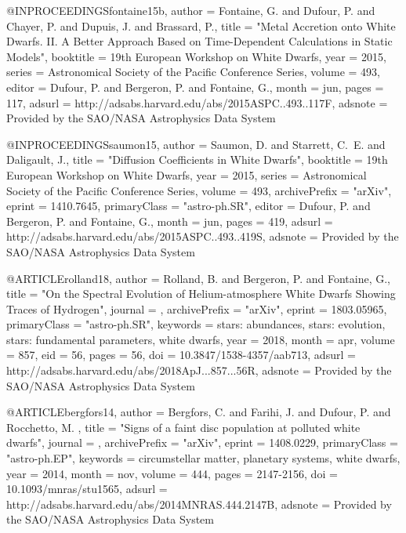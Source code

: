 \documentclass[a4paper,fleqn,usenatbib]{mnras}
\begin{document}
{{{@INPROCEEDINGS{fontaine15b,
   author = {{Fontaine}, G. and {Dufour}, P. and {Chayer}, P. and {Dupuis}, J. and 
	{Brassard}, P.},
    title = "{Metal Accretion onto White Dwarfs. II. A Better Approach Based on Time-Dependent Calculations in Static Models}",
booktitle = {19th European Workshop on White Dwarfs},
     year = 2015,
   series = {Astronomical Society of the Pacific Conference Series},
   volume = 493,
   editor = {{Dufour}, P. and {Bergeron}, P. and {Fontaine}, G.},
    month = jun,
    pages = {117},
   adsurl = {http://adsabs.harvard.edu/abs/2015ASPC..493..117F},
  adsnote = {Provided by the SAO/NASA Astrophysics Data System}
}

@INPROCEEDINGS{saumon15,
   author = {{Saumon}, D. and {Starrett}, C.~E. and {Daligault}, J.},
    title = "{Diffusion Coefficients in White Dwarfs}",
booktitle = {19th European Workshop on White Dwarfs},
     year = 2015,
   series = {Astronomical Society of the Pacific Conference Series},
   volume = 493,
archivePrefix = "arXiv",
   eprint = {1410.7645},
 primaryClass = "astro-ph.SR",
   editor = {{Dufour}, P. and {Bergeron}, P. and {Fontaine}, G.},
    month = jun,
    pages = {419},
   adsurl = {http://adsabs.harvard.edu/abs/2015ASPC..493..419S},
  adsnote = {Provided by the SAO/NASA Astrophysics Data System}
}





@ARTICLE{rolland18,
   author = {{Rolland}, B. and {Bergeron}, P. and {Fontaine}, G.},
    title = "{On the Spectral Evolution of Helium-atmosphere White Dwarfs Showing Traces of Hydrogen}",
  journal = {\apj},
archivePrefix = "arXiv",
   eprint = {1803.05965},
 primaryClass = "astro-ph.SR",
 keywords = {stars: abundances, stars: evolution, stars: fundamental parameters, white dwarfs},
     year = 2018,
    month = apr,
   volume = 857,
      eid = {56},
    pages = {56},
      doi = {10.3847/1538-4357/aab713},
   adsurl = {http://adsabs.harvard.edu/abs/2018ApJ...857...56R},
  adsnote = {Provided by the SAO/NASA Astrophysics Data System}
}

@ARTICLE{bergfors14,
   author = {{Bergfors}, C. and {Farihi}, J. and {Dufour}, P. and {Rocchetto}, M.
	},
    title = "{Signs of a faint disc population at polluted white dwarfs}",
  journal = {\mnras},
archivePrefix = "arXiv",
   eprint = {1408.0229},
 primaryClass = "astro-ph.EP",
 keywords = {circumstellar matter, planetary systems, white dwarfs},
     year = 2014,
    month = nov,
   volume = 444,
    pages = {2147-2156},
      doi = {10.1093/mnras/stu1565},
   adsurl = {http://adsabs.harvard.edu/abs/2014MNRAS.444.2147B},
  adsnote = {Provided by the SAO/NASA Astrophysics Data System}
}

}}}
\end{document}
